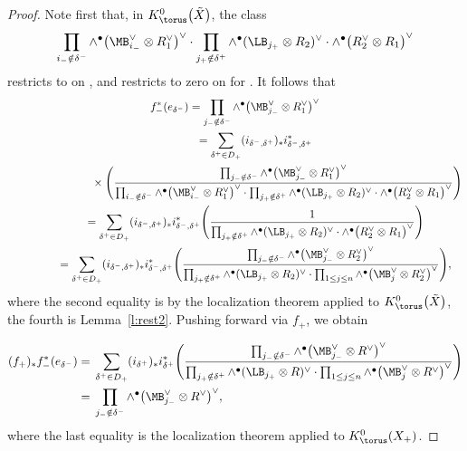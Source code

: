 \begin{proof}
Note first that,
in $K^0_\torus\bigl(\tilde X\bigr)$, the class
\[
\prod_{ i_{-} \notin \delta^-} \wedge^\bullet \bigl(\MB_{i_{-}}^\vee \otimes R_1^\vee\bigr)^\vee \cdot \prod_{j_{+} \notin \delta^+} \wedge^\bullet ( \LB_{j_+} \otimes R_2)^\vee \cdot \wedge^\bullet \bigl(R_2^\vee \otimes R_1\bigr)^\vee
\]
restricts to  on
, and restricts to zero on  for .
It follows that
\begin{gather*}
f_{-}^*(e_{\delta^-}) = \prod_{j_- \notin \delta^-} \wedge^\bullet \bigl(\MB_{j_-}^\vee \otimes R_1^\vee\bigr)^\vee \\
\hphantom{f_{-}^*(e_{\delta^-})}{}
= \sum_{\delta^+ \in D_{+}} (i_{\delta^-, \delta^+})_*i_{\delta^-, \delta^+}^* \\
\hphantom{f_{-}^*(e_{\delta^-}) =\sum_{\delta^+ \in D_{+}}}{}
 \times\Biggl(\frac{\prod_{j_- \notin \delta^-} \wedge^\bullet \bigl(\MB_{j_-}^\vee \otimes R_1^\vee\bigr)^\vee}
{ \prod_{ i_{-} \notin \delta^-} \wedge^\bullet \bigl(\MB_{i_{-}}^\vee \otimes R_1^\vee\bigr)^\vee \cdot \prod_{j_{+} \notin \delta^+} \wedge^\bullet ( \LB_{j_+} \otimes R_2)^\vee \cdot \wedge^\bullet \bigl(R_2^\vee \otimes R_1\bigr)^\vee}\Biggr)
\\
\hphantom{f_{-}^*(e_{\delta^-})}{}
= \sum_{\delta^+ \in D_{+}} (i_{\delta^-, \delta^+})_*i_{\delta^-, \delta^+}^* \Biggl(\frac{1}
{ \prod_{j_{+} \notin \delta^+} \wedge^\bullet ( \LB_{j_+} \otimes R_2)^\vee \cdot \wedge^\bullet \bigl(R_2^\vee \otimes R_1\bigr)^\vee}\Biggr)
\\
\hphantom{f_{-}^*(e_{\delta^-})}{}
= \sum_{\delta^+ \in D_{+}} (i_{\delta^-, \delta^+})_*i_{\delta^-, \delta^+}^* \Biggl(\frac{\prod_{j_- \notin \delta^-} \wedge^\bullet \bigl(\MB_{j_-}^\vee \otimes R_2^\vee\bigr)^\vee }
{ \prod_{j_{+} \notin \delta^+} \wedge^\bullet ( \LB_{j_+} \otimes R_2)^\vee \cdot \prod_{1 \leq j \leq n} \wedge^\bullet \bigl(\MB_{j}^\vee \otimes R_2^\vee\bigr)^\vee }\Biggr),
\end{gather*}
where the second equality is by the localization theorem applied to $K^0_\torus\bigl(\tilde X\bigr)$, the fourth is Lemma~\ref{l:rest2}.
Pushing forward via $f_{+}$, we obtain

\begin{align*}
(f_{+})_* f_{-}^*(e_{\delta^-})
={}& \sum_{\delta^+ \in D_{+}} (i_{\delta^+})_*i_{\delta^+}^* \Biggl(\frac{\prod_{j_- \notin \delta^-} \wedge^\bullet \bigl(\MB_{j_-}^\vee \otimes R^\vee\bigr)^\vee }
{ \prod_{j_{+} \notin \delta^+} \wedge^\bullet ( \LB_{j_+} \otimes R)^\vee \cdot \prod_{1 \leq j \leq n} \wedge^\bullet \bigl(\MB_{j}^\vee \otimes R^\vee\bigr)^\vee }\Biggr) \\
={}& \prod_{j_- \notin \delta^-} \wedge^\bullet \bigl(\MB_{j_-}^\vee \otimes R^\vee\bigr)^\vee,
\end{align*}
where the last equality is the localization theorem applied to $K^0_\torus(X_{+})$.
\end{proof}

